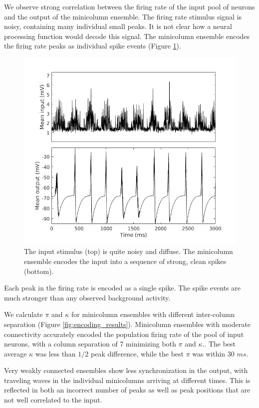 \documentclass[a4paper,11pt]{article}
\begin{document}
We observe strong correlation between the firing rate of the input pool of neurons and the output of the minicolumn ensemble.
The firing rate stimulus signal is noisy, containing many individual small peaks. 
It is not clear how a neural processing function would decode this signal.
The minicolumn ensemble encodes the firing rate peaks as individual spike events (Figure \ref{fig:goodIO}).
\begin{figure}[!ht]
 \caption{The input stimulus (top) is quite noisy and diffuse. The minicolumn ensemble encodes the input into a sequence of strong, clean spikes (bottom).}
 \label{fig:goodIO}
 \centering
   \includegraphics[width=\textwidth]{fig/InputOutput_Sep7}
\end{figure}
Each peak in the firing rate is encoded as a single spike.
The spike events are much stronger than any observed background activity.

We calculate $\pi$ and $\kappa$ for minicolumn ensembles with different inter-column separation (Figure \ref{fig:encoding_results}).  
Minicolumn ensembles with moderate connectivity accurately encoded the population firing rate of the pool of input neurons, with a column separation of 7 minimizing both $\pi$ and $\kappa$..
The best average $\kappa$ was less than $1/2$ peak difference, while the best $\pi$ was within 30 $ms$.

Very weakly connected ensembles show less synchronization in the output, with traveling waves in the individual minicolumns arriving at different times.
This is reflected in both an incorrect number of peaks as well as peak positions that are not well correlated to the input.
\end{document}
